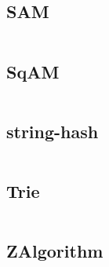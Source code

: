 \documentclass[a4]{article}
\begin{document}
\subsection{SAM}
\inputminted[mathescape,linenos,numbersep=5pt,frame=lines,framesep=2mm]{cpp}{src/string/SAM.cpp}
\subsection{SqAM}
\inputminted[mathescape,linenos,numbersep=5pt,frame=lines,framesep=2mm]{cpp}{src/string/SqAM.cpp}
\subsection{string-hash}
\inputminted[mathescape,linenos,numbersep=5pt,frame=lines,framesep=2mm]{cpp}{src/string/string-hash.cpp}
\subsection{Trie}
\inputminted[mathescape,linenos,numbersep=5pt,frame=lines,framesep=2mm]{cpp}{src/string/Trie.cpp}
\subsection{ZAlgorithm}
\inputminted[mathescape,linenos,numbersep=5pt,frame=lines,framesep=2mm]{cpp}{src/string/ZAlgorithm.cpp}

\end{document}
